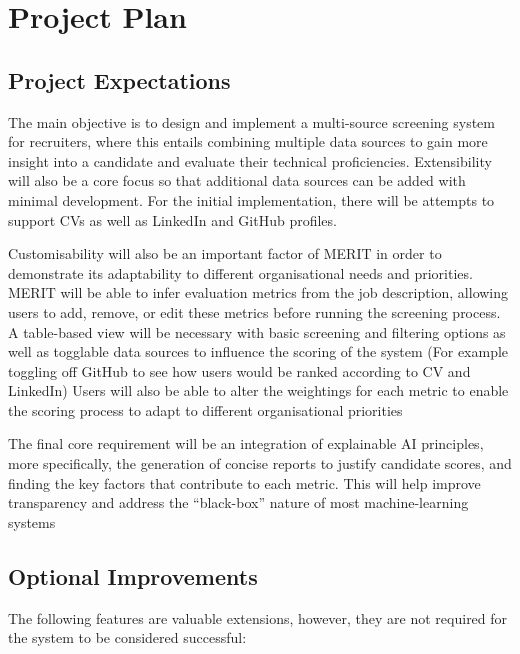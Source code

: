 \chapter{Project Plan}

\section{Project Expectations}
The main objective is to design and implement a multi-source screening system for recruiters, where this entails combining multiple data sources to gain more insight into a candidate and evaluate their technical proficiencies. 
Extensibility will also be a core focus so that additional data sources can be added with minimal development.
For the initial implementation, there will be attempts to support CVs as well as LinkedIn and GitHub profiles.

Customisability will also be an important factor of MERIT in order to demonstrate its adaptability to different organisational needs and priorities.
MERIT will be able to infer evaluation metrics from the job description, allowing users to add, remove, or edit these metrics before running the screening process.
A table-based view will be necessary with basic screening and filtering options as well as togglable data sources to influence the scoring of the system (For example toggling off GitHub to see how users would be ranked according to CV and LinkedIn)
Users will also be able to alter the weightings for each metric to enable the scoring process to adapt to different organisational priorities

The final core requirement will be an integration of explainable AI principles, more specifically, the generation of concise reports to justify candidate scores, and finding the key factors that contribute to each metric. This will help improve transparency and address the “black-box” nature of most machine-learning systems

\section{Optional Improvements}
The following features are valuable extensions, however, they are not required for the system to be considered successful:


